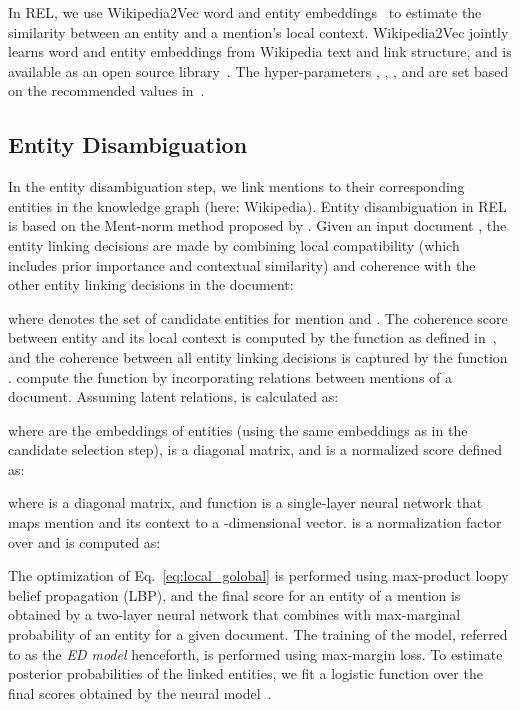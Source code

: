 \documentclass[sigconf]{acmart}
\newcommand{\miniskip}{\vspace*{-.5\baselineskip}}
\begin{document}
In REL, we use Wikipedia2Vec word and entity embeddings~\cite{Yamada:2016:JLE} to estimate the similarity between an entity and a mention's local context. Wikipedia2Vec jointly learns word and entity embeddings from Wikipedia text and link structure, and is available as an open source library~\cite{Yamada:2018:WOT}. The hyper-parameters , , , and  are set based on the recommended values in~\cite{Le:2018:IEL, Ganea:2017:DJE}.


\miniskip
 \subsection{Entity Disambiguation}
 \label{sec:approach:ed} 
In the entity disambiguation step, we link mentions to their corresponding entities in the knowledge graph (here: Wikipedia). Entity disambiguation in REL is based on the Ment-norm method proposed by \citet{Le:2018:IEL}. Given an input document , the entity linking decisions are made by combining local compatibility (which includes prior importance and contextual similarity) and coherence with the other entity linking decisions in the document:

where  denotes the set of candidate entities for mention  and . The coherence score between entity  and its local context  is computed by the function  as defined in~\citep{Ganea:2017:DJE}, and the coherence between all entity linking decisions is captured by the function . \citet{Le:2018:IEL} compute the  function by incorporating relations between mentions of a document. Assuming  latent relations,  is calculated as:

where  are the embeddings of entities  (using the same embeddings as in the candidate selection step),  is a diagonal matrix, and  is a normalized score defined as: 

where  is a diagonal matrix, and function  is a single-layer neural network that maps mention  and its context  to a -dimensional vector.  is a normalization factor over  and is computed as:

The optimization of Eq.~\eqref{eq:local_golobal} is performed using max-product loopy belief propagation (LBP), and the final score for an entity of a mention is obtained by a two-layer neural network that combines  with max-marginal probability of an entity for a given document.
The training of the model, referred to as the \emph{ED model} henceforth, is performed using max-margin loss.
To estimate posterior probabilities of the linked entities, we fit a logistic function over the final scores obtained by the neural model~\cite{Platt:2000:PSVM}.
\end{document}
